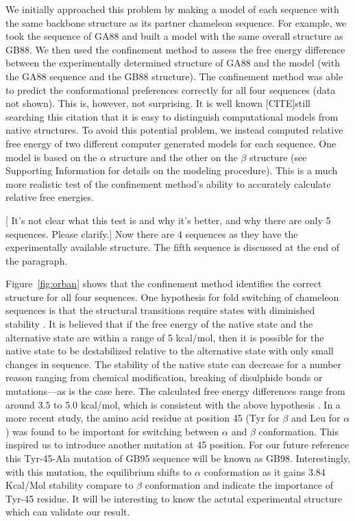 \documentclass[12pt]{article}
\newcommand{\Arijit}[1]{\color{magenta}#1\normalcolor}
\newcommand{\Ken}[1]{\color{red}#1\normalcolor}
\begin{document}
We initially approached this problem by making a model of each sequence with the same backbone
structure as its partner chameleon sequence. For example, we took the sequence of GA88 and built a
model with the same overall structure as GB88. We then used the confinement method to assess the
free energy difference between the experimentally determined structure of GA88 and the model (with
the GA88 sequence and the GB88 structure). The confinement method was able to predict the
conformational preferences correctly for all four sequences (data not shown). This is, however, not
surprising. It is well known [CITE]\Arijit{still searching this citation} that it is easy to distinguish 
computational models from native structures. To avoid this potential problem, we instead computed relative free energy of two
different computer generated models for each sequence. One model is based on the $\alpha$ structure and
the other on the $\beta$ structure (see Supporting Information for details on the modeling procedure).
This is a much more realistic test of the confinement method's ability to accurately calculate
relative free energies. 
 
\Ken{[ It's not clear what this test is and why it's better, and why there are only 5 sequences.  Please clarify.]}
\Arijit{ Now there are 4 sequences as they have the experimentally available structure. The fifth sequence is discussed 
at the end of the paragraph.}


Figure~\ref{fig:orban} shows that the confinement method identifies the correct structure for all four sequences. One hypothesis for fold switching of
chameleon sequences is that the structural transitions require states with diminished stability
\cite{Bryan2010}. It is believed that if the free energy of the native state and the alternative state are
within a range of 5 kcal/mol, then it is possible for the native state to be destabilized relative
to the alternative state with only small changes in sequence. The stability of the native state can
decrease for a number reason ranging from chemical modification, breaking of disulphide bonds or
mutations---as is the case here. The calculated free energy differences range from around 3.5 to 5.0
kcal/mol, which is consistent with the above hypothesis \cite{He2008,Alexander2009,Bryan2010}. 
In a more recent study\cite{He2012}, the amino acid residue at position 45 (Tyr for $\beta$ and Leu for $\alpha$) was
found to be important for switching between  $\alpha$ and $\beta$ conformation. This inspired us to 
introduce another mutation at 45 position. For our future reference this Tyr-45-Ala mutation of GB95 sequence will
be known as GB98. Interestingly, with this mutation, the equilibrium shifts to $\alpha$ conformation as it gains 3.84 Kcal/Mol 
stability compare to $\beta$ conformation and indicate the importance of Tyr-45 residue. It will be interesting to 
know the actutal experimental structure which can validate our result.  
\end{document}
